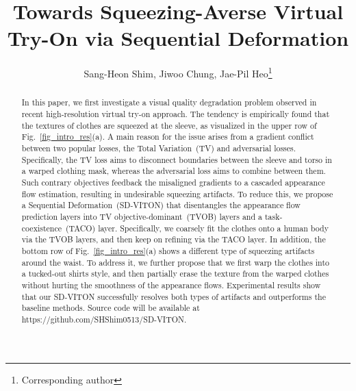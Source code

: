 \documentclass[letterpaper]{article} %
\title{Towards Squeezing-Averse Virtual Try-On via Sequential Deformation}
\author{
    Sang-Heon Shim, 
    Jiwoo Chung, 
    Jae-Pil Heo\thanks{Corresponding author}
}
\begin{document}
\maketitle


\begin{abstract}
    In this paper, we first investigate a visual quality degradation problem observed in recent high-resolution virtual try-on approach.
    The tendency is empirically found that the textures of clothes are squeezed at the sleeve, as visualized in the upper row of Fig.~\ref{fig_intro_res}(a).
    A main reason for the issue arises from a gradient conflict between two popular losses, the Total Variation~(TV) and adversarial losses.
    Specifically, the TV loss aims to disconnect boundaries between the sleeve and torso in a warped clothing mask, whereas the adversarial loss aims to combine between them.
    Such contrary objectives feedback the misaligned gradients to a cascaded appearance flow estimation, resulting in undesirable squeezing artifacts.
    To reduce this, we propose a Sequential Deformation~(SD-VITON) that disentangles the appearance flow prediction layers into TV objective-dominant~(TVOB) layers and a task-coexistence~(TACO) layer.
    Specifically, we coarsely fit the clothes onto a human body via the TVOB layers, and then keep on refining via the TACO layer.
    In addition, the bottom row of Fig.~\ref{fig_intro_res}(a) shows a different type of squeezing artifacts around the waist.
    To address it, we further propose that we first warp the clothes into a tucked-out shirts style, and then partially erase the texture from the warped clothes without hurting the smoothness of the appearance flows.
    Experimental results show that our SD-VITON successfully resolves both types of artifacts and outperforms the baseline methods.
    Source code will be available at https://github.com/SHShim0513/SD-VITON.
\end{abstract}
\end{document}
